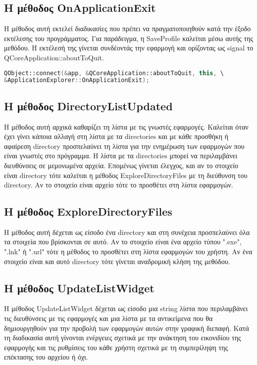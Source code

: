 \subsection{Η μέθοδος OnApplicationExit}
Η μέθοδος αυτή εκτελεί διαδικασίες που πρέπει να πραγματοποιηθούν κατά την έξοδο εκτέλεσης
του προγράμματος. Για παράδειγμα, η SaveProfile καλείται μέσω αυτής της μεθόδου. Η εκτέλεσή
της γίνεται συνδέοντάς την εφαρμογή και ορίζοντας ως signal το QCoreApplication::aboutToQuit.

\begin{lstlisting}[language=C++, style=cppstyle]
QObject::connect(&app, &QCoreApplication::aboutToQuit, this, \
&ApplicationExplorer::OnApplicationExit);
\end{lstlisting}

\subsection{Η μέθοδος DirectoryListUpdated}
Η μέθοδος αυτή αρχικά καθαρίζει τη λίστα με τις γνωστές εφαρμογές. Καλείται όταν έχει γίνει
κάποια αλλαγή στη λίστα με τα directories και με κάθε προσθήκη ή αφαίρεση directory προσπελαύνει
τη λίστα για την ενημέρωση των εφαρμογών που είναι γνωστές στο πρόγραμμα. Η λίστα με τα directories
μπορεί να περιλαμβάνει διευθύνσεις σε μεμονωμένα αρχεία. Επομένως γίνεται έλεγχος, και αν το στοιχείο
είναι directory τότε καλείται η μέθοδος ExploreDirectoryFiles με τη διεύθυνση του directory. Αν
το στοιχείο είναι αρχείο τότε το προσθέτει στη λίστα εφαρμογών.


\subsection{Η μέθοδος ExploreDirectoryFiles}
Η μέθοδος αυτή δέχεται ως είσοδο ένα directory και στη συνέχεια προσπελαύνει όλα
τα στοιχεία που βρίσκονται σε αυτό. Αν το στοιχείο είναι ένα αρχείο τύπου ".exe", ".lnk"
ή ".url" τότε η μέθοδος το προσθέτει στη λίστα εφαρμογών του χρήστη. Αν ένα στοιχείο 
είναι και αυτό directory τότε γίνεται αναδρομική κλήση της μεθόδου.


\subsection{Η μέθοδος UpdateListWidget}
Η μέθοδος UpdateListWidget δέχεται ως είσοδο μια string λίστα που περιλαμβάνει τις
διευθύνσεις με τις εφαρμογές και μια λίστα με τα αντικείμενα που θα δημιουργηθούν
για την προβολή των εφαρμογών αυτών στην γραφική διεπαφή. Κατά τη διαδικασία αυτή
γίνονται ενέργειες σχετικά με την ανάκτηση του εικονιδίου της εφαρμογής και τις
ρυθμίσεις του κάθε χρήστη σχετικά με τη συμπερίληψη της επέκτασης του αρχείου ή όχι.

